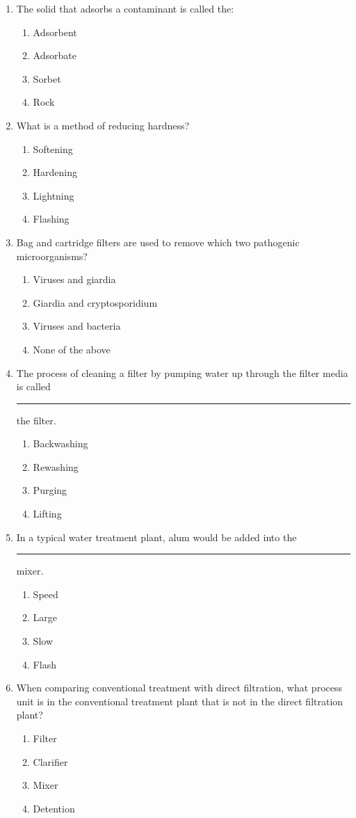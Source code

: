 \begin{enumerate}
\item The solid that adsorbs a contaminant is called the:
\begin{enumerate}
\item Adsorbent
\item Adsorbate
\item Sorbet
\item Rock
\end{enumerate}

\item What is a method of reducing hardness?
\begin{enumerate}
\item Softening
\item Hardening
\item Lightning
\item Flashing
\end{enumerate}


\item Bag and cartridge filters are used to remove which two pathogenic microorganisms?
\begin{enumerate}
\item Viruses and giardia
\item Giardia and cryptosporidium
\item Viruses and bacteria
\item None of the above
\end{enumerate}

\item The process of cleaning a filter by pumping water up through the filter media is called \rule{2cm}{0.3pt} the filter.
\begin{enumerate}
\item Backwashing
\item Rewashing
\item Purging
\item Lifting
\end{enumerate}

\item In a typical water treatment plant, alum would be added into the \rule{2cm}{0.3pt} mixer.
\begin{enumerate}
\item Speed
\item Large
\item Slow
\item Flash
\end{enumerate}

\item When comparing conventional treatment with direct filtration, what process unit is in the conventional treatment plant that is not in the direct filtration plant?
\begin{enumerate}
\item Filter
\item Clarifier
\item Mixer
\item Detention
\end{enumerate}


\end{enumerate}
